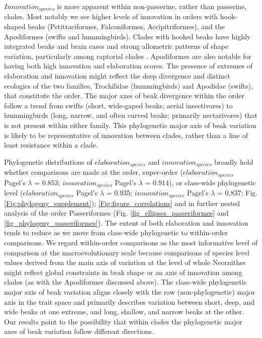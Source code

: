 \documentclass[12pt,letterpaper]{article}
\begin{document}
$Innovation_{species}$ is more apparent within non-passerine, rather than passerine, clades.
Most notably we see higher levels of innovation in orders with hook-shaped beaks (Pstittaciformes, Falconiformes, Accipitriformes), and the Apodiformes (swifts and hummingbirds).
Clades with hooked beaks have highly integrated beaks and brain cases and strong allometric patterns of shape variation, particularly among raptorial clades \cite{bright2016shapes, bright2019multifactorial}.
Apodiformes are also notable for having both high innovation and elaboration scores.
The presence of extremes of elaboration and innovation might reflect the deep divergence and distinct ecologies of the two families, Trochilidae (hummingbirds) and Apodidae (swifts), that constitute the order.
The major axes of beak divergence within the order follow a trend from swifts (short, wide-gaped beaks; aerial insectivores) to hummingbirds (long, narrow, and often curved beaks; primarily nectarivores) that is not present within either family.
This phylogenetic major axis of beak variation is likely to be representative of innovation between clades, rather than a line of least resistance within a clade.

Phylogenetic distributions of $elaboration_{species}$ and $innovation_{species}$ broadly hold whether comparisons are made at the order, super-order ($elaboration_{species}$ Pagel's $\lambda$ = 0.853; $innovation_{species}$ Pagel's $\lambda$ = 0.914), or class-wide phylogenetic level ($elaboration_{species}$ Pagel's $\lambda$ = 0.935; $innovation_{species}$ Pagel’s $\lambda$ = 0.837; Fig. \ref{Fig:phylogeny_supplement}); \ref{Fig:figure_correlations} %
and in further nested analysis of the order Passeriformes (Fig. \ref{fig_ellipses_passeriformes} and \ref{fig_phylogeny_passeriformes}).
The extent of both elaboration and innovation tends to reduce as we move from class-wide phylogenetic to within-order comparisons.
We regard within-order comparisons as the most informative level of comparison at the macroevolutionary scale
because comparisons of species level values derived from the main axis of variation at the level of whole Neornithes might reflect global constraints in beak shape or an axis of innovation among clades (as with the Apodiformes discussed above).
The class-wide phylogenetic major axis of beak variation aligns closely with the raw (non-phylogenetic) major axis in the trait space and primarily describes variation between short, deep, and wide beaks at one extreme, and long, shallow, and narrow beaks at the other.
Our results point to the possibility that within clades the phylogenetic major axes of beak variation follow different directions.
\end{document}

